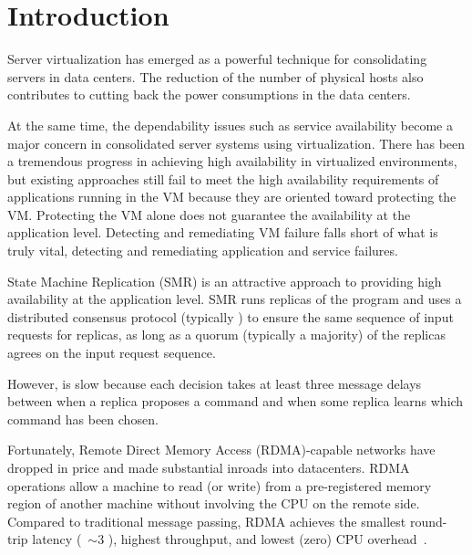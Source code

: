 \section{Introduction} \label{sec:intro}

Server virtualization has emerged as a powerful technique for consolidating servers in 
data centers. The reduction of the number of physical hosts also contributes to cutting 
back the power consumptions in the data centers.


At the same time, the dependability issues such as service availability become a major concern 
in consolidated server systems using virtualization. There has been a tremendous progress in 
achieving high availability in virtualized environments, but existing approaches still fail to 
meet the high availability requirements of applications running in the VM because they are oriented 
toward protecting the VM. Protecting the VM alone does not guarantee the availability at the 
application level. Detecting and remediating VM failure falls short of what is truly vital, 
detecting and remediating application and service failures.

State Machine Replication (SMR) is an attractive approach to providing high availability at the 
application level. SMR runs replicas of the program and uses a distributed consensus protocol 
(typically \paxos) to ensure the same sequence of input requests for replicas, as long as a 
quorum (typically a majority) of the replicas agrees on the input request sequence.

However, \paxos is slow because each decision takes at least three message delays between when 
a replica proposes a command and when some replica learns which command has been chosen.

Fortunately, Remote Direct Memory Access (RDMA)-capable networks have dropped in price and made 
substantial inroads into datacenters. RDMA operations allow a machine to read (or write) from a 
pre-registered memory region of another machine without involving the CPU on the remote side. 
Compared to traditional message passing, RDMA achieves the smallest round-trip latency 
(~$\sim$3 \us), highest throughput, and lowest (zero) CPU overhead~\cite{pilaf:usenix14}.

